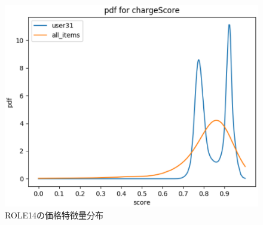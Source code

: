 \begin{figure}[H]
  \begin{center}
    \includegraphics[width=6in]{source/ROLE14-charge.eps}
  \vspace{1mm}
  \caption{ROLE14の価格特徴量分布} %
  \label{fig:ROLE14-charge}
  \end{center} 
\end{figure}



